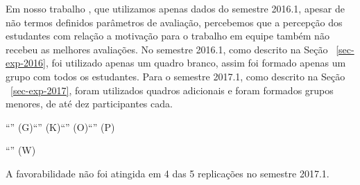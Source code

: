 Em nosso trabalho \cite{gavaza2017}, que utilizamos apenas dados do
semestre 2016.1, apesar de não termos definidos parâmetros
de avaliação, percebemos que a percepção dos estudantes com relação
a motivação para o trabalho em equipe também não recebeu as melhores
avaliações.
No semestre 2016.1, como descrito na Seção ~\ref{sec-exp-2016}, foi utilizado
apenas um quadro branco, assim foi formado apenas um grupo com todos
os estudantes.
Para o semestre 2017.1, como descrito na Seção ~\ref{sec-exp-2017}, foram
utilizados quadros adicionais e foram formados grupos menores,
de até dez participantes cada.


\AprovacaoHipoteseResultado{}{}{}{}{}{}{}{}{}

{``\LikertPG'' (G)}{``\LikertPK'' (K)}{``\LikertPO'' (O)}{``\LikertPP'' (P)}


{``\LikertPW'' (W)}{}{}{}

A favorabilidade não foi atingida em 4 das 5 replicações no
semestre 2017.1.

